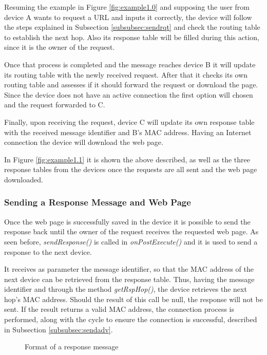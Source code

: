 Resuming the example in Figure \ref{fig:example1.0} and supposing the user from device A wants to request a \gls{URL} and inputs it correctly, the device will follow the steps explained in Subsection \ref{subsubsec:sendrqt} and check the routing table to establish the next hop. Also its response table will be filled during this action, since it is the owner of the request.

Once that process is completed and the message reaches device B it will update its routing table with the newly received request. After that it checks its own routing table and assesses if it should forward the request or download the page. Since the device does not have an active connection the first option will chosen and the request forwarded to C.

Finally, upon receiving the request, device C will update its own response table with the received message identifier and B's \gls{MAC} address. Having an Internet connection the device will download the web page.

In Figure \ref{fig:example1.1} it is shown the above described, as well as the three response tables from the devices once the requests are all sent and the web page downloaded.

\subsubsection{Sending a Response Message and Web Page}
\label{subsubsec:sendrsp}

Once the web page is successfully saved in the device it is possible to send the response back until the owner of the request receives the requested web page. As seen before, \textit{sendResponse()} is called in \textit{onPostExecute()} and it is used to send a response to the next device.

It receives as parameter the message identifier, so that the \gls{MAC} address of the next device can be retrieved from the response table. Thus, having the message identifier and through the method \textit{getRspHop()}, the device retrieves the next hop's \gls{MAC} address. Should the result of this call be null, the response will not be sent. If the result returns a valid \gls{MAC} address, the connection process is performed, along with the cycle to ensure the connection is successful, described in Subsection \ref{subsubsec:sendadv}.

\begin{figure}[ht]
   \noindent{}
	\caption{\label{fig:rspmsg} Format of a response message}
\end{figure}

